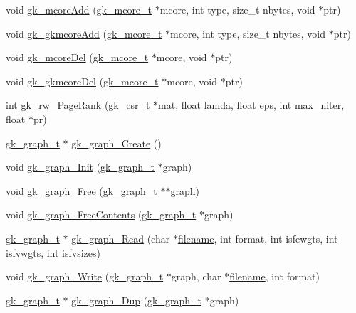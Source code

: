 \begin{DoxyCompactItemize}
void \hyperlink{a00077_a366348b623d380f773e5946011e14059}{gk\+\_\+mcore\+Add} (\hyperlink{a00682}{gk\+\_\+mcore\+\_\+t} $\ast$mcore, int type, size\+\_\+t nbytes, void $\ast$ptr)
\item 
void \hyperlink{a00077_a3777d3929aad6ae5e17b76656cd6797b}{gk\+\_\+gkmcore\+Add} (\hyperlink{a00682}{gk\+\_\+mcore\+\_\+t} $\ast$mcore, int type, size\+\_\+t nbytes, void $\ast$ptr)
\item 
void \hyperlink{a00077_a0e63861ea56a62080a63408af43a9075}{gk\+\_\+mcore\+Del} (\hyperlink{a00682}{gk\+\_\+mcore\+\_\+t} $\ast$mcore, void $\ast$ptr)
\item 
void \hyperlink{a00077_a6b0166aa10e35fb252f8561cac8f3bbb}{gk\+\_\+gkmcore\+Del} (\hyperlink{a00682}{gk\+\_\+mcore\+\_\+t} $\ast$mcore, void $\ast$ptr)
\item 
int \hyperlink{a00077_a5f79542ae883d026565a71bab5bca8d4}{gk\+\_\+rw\+\_\+\+Page\+Rank} (\hyperlink{a00634}{gk\+\_\+csr\+\_\+t} $\ast$mat, float lamda, float eps, int max\+\_\+niter, float $\ast$pr)
\item 
\hyperlink{a00638}{gk\+\_\+graph\+\_\+t} $\ast$ \hyperlink{a00077_a0d092a371d797437de53ae1a64bd78f4}{gk\+\_\+graph\+\_\+\+Create} ()
\item 
void \hyperlink{a00077_ab017e0e6f2436f3ad24ea01d8b2c588c}{gk\+\_\+graph\+\_\+\+Init} (\hyperlink{a00638}{gk\+\_\+graph\+\_\+t} $\ast$graph)
\item 
void \hyperlink{a00077_a1c12a8da8ea4064302668e0ce94ad462}{gk\+\_\+graph\+\_\+\+Free} (\hyperlink{a00638}{gk\+\_\+graph\+\_\+t} $\ast$$\ast$graph)
\item 
void \hyperlink{a00077_a00a7be5e2819fb9444360695e8d047d3}{gk\+\_\+graph\+\_\+\+Free\+Contents} (\hyperlink{a00638}{gk\+\_\+graph\+\_\+t} $\ast$graph)
\item 
\hyperlink{a00638}{gk\+\_\+graph\+\_\+t} $\ast$ \hyperlink{a00077_a432baae7f5c91c3604b42efb324b4131}{gk\+\_\+graph\+\_\+\+Read} (char $\ast$\hyperlink{a00623_a42a21beb8018ac623f4d09db1343b9cf}{filename}, int format, int isfewgts, int isfvwgts, int isfvsizes)
\item 
void \hyperlink{a00077_a92bfa3f7bc76f9fb591ad67f665383e9}{gk\+\_\+graph\+\_\+\+Write} (\hyperlink{a00638}{gk\+\_\+graph\+\_\+t} $\ast$graph, char $\ast$\hyperlink{a00623_a42a21beb8018ac623f4d09db1343b9cf}{filename}, int format)
\item 
\hyperlink{a00638}{gk\+\_\+graph\+\_\+t} $\ast$ \hyperlink{a00077_a24db906b45a9848fc26c49cb967d68c8}{gk\+\_\+graph\+\_\+\+Dup} (\hyperlink{a00638}{gk\+\_\+graph\+\_\+t} $\ast$graph)
$$
\end{DoxyCompactItemize}

